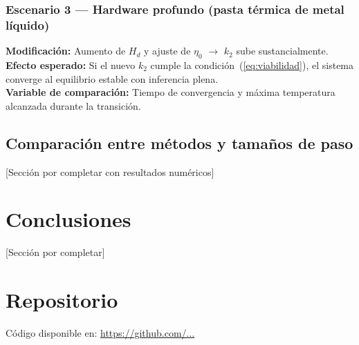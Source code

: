 \documentclass[10pt, twocolumn]{article}
\begin{document}
\subsubsection*{Escenario 3 --- Hardware profundo (pasta térmica de metal líquido)}
\textbf{Modificación:} Aumento de $H_d$ y ajuste de $\eta_0$
$\rightarrow$ $k_2$ sube sustancialmente.\\
\textbf{Efecto esperado:} Si el nuevo $k_2$ cumple la condición~(\ref{eq:viabilidad}),
el sistema converge al equilibrio estable con inferencia plena.\\
\textbf{Variable de comparación:} Tiempo de convergencia y máxima temperatura
alcanzada durante la transición.

\subsection{Comparación entre métodos y tamaños de paso}

[Sección por completar con resultados numéricos]

\section{Conclusiones}
\label{sec:conclusiones}

[Sección por completar]

\section*{Repositorio}

Código disponible en: \url{https://github.com/...}
\end{document}

